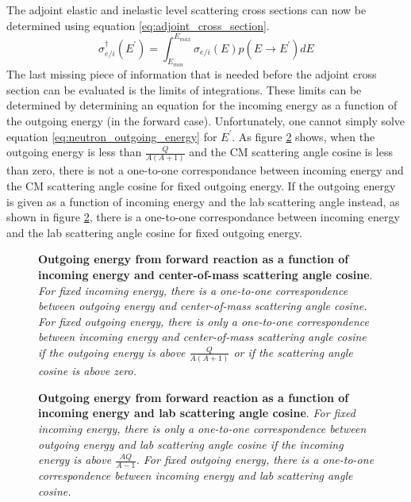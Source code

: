 The adjoint elastic and inelastic level scattering cross sections can now be
determined using equation \ref{eq:adjoint_cross_section}.
\begin{equation}
  \sigma_{e/i}^{\dagger}(E^{'}) = \int_{E_{min}}^{E_{max}} \sigma_{e/i}(E)p(E \to E^{'})
    dE
\end{equation}
The last missing piece of information that is needed before the adjoint cross
section can be evaluated is the limits of integrations. These limits can be
determined by determining an equation for the incoming energy as a function of
the outgoing energy (in the forward case). Unfortunately, one cannot simply
solve equation \ref{eq:neutron_outgoing_energy} for $E^{'}$. As figure
\ref{fig:in_out_energies_cm} shows, when the outgoing energy is less than
$\frac{Q}{A(A+1)}$ and the CM scattering angle cosine is less than zero, there 
is not a one-to-one correspondance between incoming energy and the CM 
scattering angle cosine for fixed outgoing energy. If the outgoing energy is 
given as a function of incoming energy and the lab scattering angle instead, as 
shown in figure \ref{fig:in_out_energies_cm}, there is a one-to-one 
correspondance between incoming energy and the lab scattering angle cosine for 
fixed outgoing energy.
\begin{figure}[t!]
  \begin{center}
    
  \end{center}
  \caption{\textbf{Outgoing energy from forward reaction as a function of 
      incoming energy and center-of-mass scattering angle cosine}.
    \textit{For fixed incoming energy, there is a one-to-one correspondence
      between outgoing energy and center-of-mass scattering angle cosine. For
      fixed outgoing energy, there is only a one-to-one correspondence
      between incoming energy and center-of-mass scattering angle cosine if the
      outgoing energy is above $\frac{Q}{A(A+1)}$ or if the scattering angle
      cosine is above zero.}}
  \label{fig:in_out_energies_cm}
\end{figure}
\begin{figure}[t!]
  \begin{center}
    
  \end{center}
  \caption{\textbf{Outgoing energy from forward reaction as a function of 
      incoming energy and lab scattering angle cosine}.
    \textit{For fixed incoming energy, there is only a one-to-one correspondence
      between outgoing energy and lab scattering angle cosine if the
      incoming energy is above $\frac{AQ}{A-1}$. For fixed outgoing energy,
      there is a one-to-one correspondence between incoming energy and lab
      scattering angle cosine.}}
  \label{fig:in_out_energies_cm}
\end{figure}
